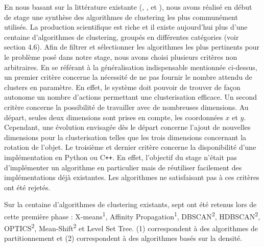 \documentclass[draft]{llncs}
\begin{document}
En nous basant sur la littérature existante (\cite{Xu2015}, \cite{Andreopoulos2009}, \cite{Fahad2014} et \cite{Sajana2016}), nous avons réalisé en début de stage une synthèse des algorithmes de clustering les plus communément utilisés.
La production scientifique est riche et il existe aujourd'hui plus d'une centaine d'algorithmes de clustering, groupés en différentes catégories (voir section 4.6).
Afin de filtrer et sélectionner les algorithmes les plus pertinents pour le problème posé dans notre stage, nous avons choisi plusieurs critères non arbitraires.
En se référant à la généralisation indispensable mentionnée ci-dessus, un premier critère concerne la nécessité de ne pas fournir le nombre attendu de clusters en paramètre.
En effet, le système doit pouvoir de trouver de façon autonome un nombre d'actions permettant une clusterisation efficace.
Un second critère concerne la possibilité de travailler avec de nombreuses dimensions.
Au départ, seules deux dimensions sont prises en compte, les coordonnées $x$ et $y$.
Cependant, une évolution envisagée dès le départ concerne l'ajout de nouvelles dimensions pour la clusterisation telles que les trois dimensions concernant la rotation de l'objet.
Le troisième et dernier critère concerne la disponibilité d'une implémentation en Python ou C{}\verb!++!.
En effet, l'objectif du stage n'était pas d'implémenter un algorithme en particulier mais de réutiliser facilement des implémentations déjà existantes.
Les algorithmes ne satisfaisant pas à ces critères ont été rejetés.

Sur la centaine d'algorithmes de clustering existants, sept ont été retenus lors de cette première phase : X-means\textsuperscript{1}, Affinity Propagation\textsuperscript{1}, DBSCAN\textsuperscript{2}, HDBSCAN\textsuperscript{2}, OPTICS\textsuperscript{2}, Mean-Shift\textsuperscript{2} et Level Set Tree. (1) correspondent à des algorithmes de partitionnement et (2) correspondent à des algorithmes basés sur la densité.

\end{document}
